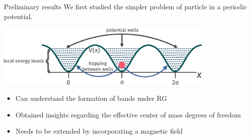 \documentclass[aspectratio=169,t]{beamer}
\begin{document}
\begin{frame}{Preliminary results}
We first studied the simpler problem of \alert{particle in a periodic potential}.

\vspace*{\fill}
\includegraphics[width=0.8\textwidth]{potential.pdf}

\vspace*{\fill}
	
\begin{itemize}
	\item Can understand the formation of bands under RG
	\item Obtained insights regarding the \alert{effective center of mass} degrees of freedom
	\item Needs to be extended by incorporating a \alert{magnetic field}
\end{itemize}
\end{frame}
\end{document}
